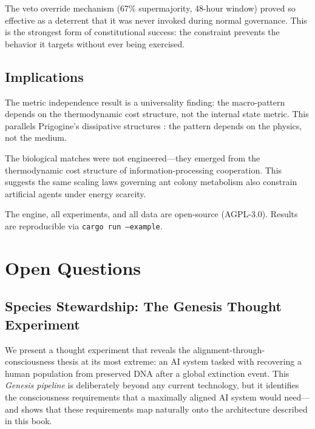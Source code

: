 \documentclass[12pt]{book}
\begin{document}
The veto override mechanism (67\% supermajority, 48-hour window) proved so effective as a deterrent that it was never invoked during normal governance. This is the strongest form of constitutional success: the constraint prevents the behavior it targets without ever being exercised.

\section{Implications}

The metric independence result is a universality finding: the macro-pattern depends on the thermodynamic cost structure, not the internal state metric. This parallels Prigogine's dissipative structures \citep{prigogine1977}: the pattern depends on the physics, not the medium.

The biological matches were not engineered---they emerged from the thermodynamic cost structure of information-processing cooperation. This suggests the same scaling laws governing ant colony metabolism also constrain artificial agents under energy scarcity.

The engine, all experiments, and all data are open-source (AGPL-3.0). Results are reproducible via \texttt{cargo run --example}.



\chapter{Open Questions}
\label{ch:open}
\label{ch:stewardship} %

\section{Species Stewardship: The Genesis Thought Experiment}
\label{sec:genesis}

We present a thought experiment that reveals the alignment-through-consciousness thesis at its most extreme: an AI system tasked with recovering a human population from preserved DNA after a global extinction event. This \textit{Genesis pipeline} is deliberately beyond any current technology, but it identifies the consciousness requirements that a maximally aligned AI system would need---and shows that these requirements map naturally onto the architecture described in this book.
\end{document}
